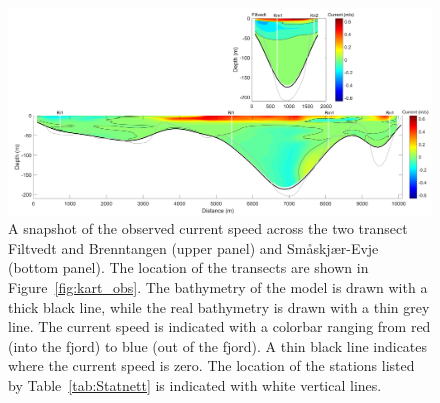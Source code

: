 \begin{figure}[ht]
	\centerline{
		\includegraphics*[trim=0 0 0 0,clip=true,width=\textwidth]{Figurer/AndreS/Two_transectas_cur}}
	\caption{\small A snapshot of the observed current speed across the two transect Filtvedt and Brenntangen (upper panel) and Sm{\aa}skj{\ae}r-Evje (bottom panel). The location of the transects are shown in Figure~\ref{fig:kart_obs}. The bathymetry of the model is drawn with a thick black line, while the real bathymetry is drawn with a thin grey line. The current speed is indicated with a colorbar ranging from red (into the fjord) to blue (out of the fjord). A thin black line indicates where the current speed is zero. The location of the stations listed by Table~\ref{tab:Statnett} is indicated with white vertical lines.}
	\label{fig:Two_transect}
\end{figure}

